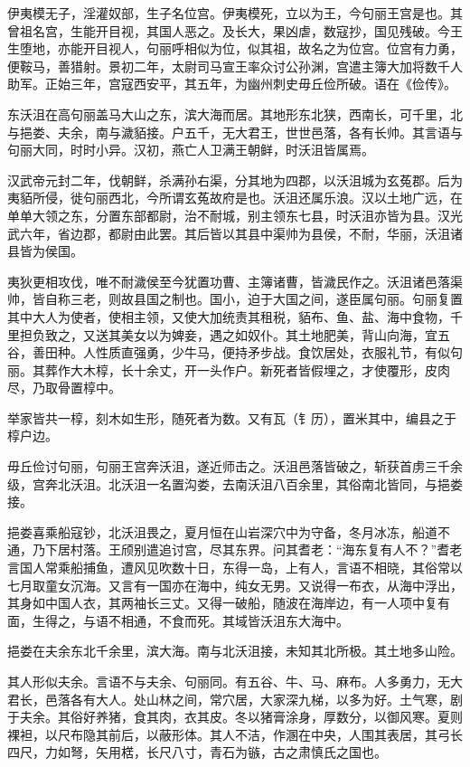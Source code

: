 \documentclass[12pt,UTF8]{ctexbook}
\begin{document}
伊夷模无子，淫灌奴部，生子名位宫。伊夷模死，立以为王，今句丽王宫是也。其曾祖名宫，生能开目视，其国人恶之。及长大，果凶虐，数寇抄，国见残破。今王生堕地，亦能开目视人，句丽呼相似为位，似其祖，故名之为位宫。位宫有力勇，便鞍马，善猎射。景初二年，太尉司马宣王率众讨公孙渊，宫遣主簿大加将数千人助军。正始三年，宫寇西安平，其五年，为幽州刺史毋丘俭所破。语在《俭传》。

东沃沮在高句丽盖马大山之东，滨大海而居。其地形东北狭，西南长，可千里，北与挹娄、夫余，南与濊貊接。户五千，无大君王，世世邑落，各有长帅。其言语与句丽大同，时时小异。汉初，燕亡人卫满王朝鲜，时沃沮皆属焉。

汉武帝元封二年，伐朝鲜，杀满孙右渠，分其地为四郡，以沃沮城为玄菟郡。后为夷貊所侵，徙句丽西北，今所谓玄菟故府是也。沃沮还属乐浪。汉以土地广远，在单单大领之东，分置东部都尉，治不耐城，别主领东七县，时沃沮亦皆为县。汉光武六年，省边郡，都尉由此罢。其后皆以其县中渠帅为县侯，不耐，华丽，沃沮诸县皆为侯国。

夷狄更相攻伐，唯不耐濊侯至今犹置功曹、主簿诸曹，皆濊民作之。沃沮诸邑落渠帅，皆自称三老，则故县国之制也。国小，迫于大国之间，遂臣属句丽。句丽复置其中大人为使者，使相主领，又使大加统责其租税，貊布、鱼、盐、海中食物，千里担负致之，又送其美女以为婢妾，遇之如奴仆。其土地肥美，背山向海，宜五谷，善田种。人性质直强勇，少牛马，便持矛步战。食饮居处，衣服礼节，有似句丽。其葬作大木椁，长十余丈，开一头作户。新死者皆假埋之，才使覆形，皮肉尽，乃取骨置椁中。

举家皆共一椁，刻木如生形，随死者为数。又有瓦（钅历），置米其中，编县之于椁户边。

毋丘俭讨句丽，句丽王宫奔沃沮，遂近师击之。沃沮邑落皆破之，斩获首虏三千余级，宫奔北沃沮。北沃沮一名置沟娄，去南沃沮八百余里，其俗南北皆同，与挹娄接。

挹娄喜乘船寇钞，北沃沮畏之，夏月恒在山岩深穴中为守备，冬月冰冻，船道不通，乃下居村落。王颀别遣追讨宫，尽其东界。问其耆老：“海东复有人不？”耆老言国人常乘船捕鱼，遭风见吹数十日，东得一岛，上有人，言语不相晓，其俗常以七月取童女沉海。又言有一国亦在海中，纯女无男。又说得一布衣，从海中浮出，其身如中国人衣，其两袖长三丈。又得一破船，随波在海岸边，有一人项中复有面，生得之，与语不相通，不食而死。其域皆沃沮东大海中。

挹娄在夫余东北千余里，滨大海。南与北沃沮接，未知其北所极。其土地多山险。

其人形似夫余。言语不与夫余、句丽同。有五谷、牛、马、麻布。人多勇力，无大君长，邑落各有大人。处山林之间，常穴居，大家深九梯，以多为好。土气寒，剧于夫余。其俗好养猪，食其肉，衣其皮。冬以猪膏涂身，厚数分，以御风寒。夏则裸袒，以尺布隐其前后，以蔽形体。其人不洁，作溷在中央，人围其表居，其弓长四尺，力如弩，矢用楛，长尺八寸，青石为镞，古之肃慎氏之国也。
\end{document}
